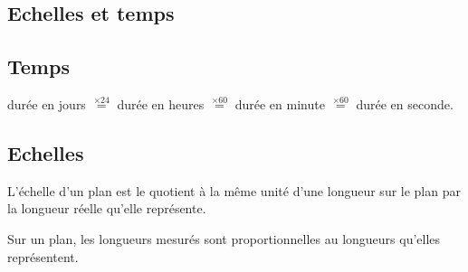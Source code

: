 \documentclass[paper=a4, fontsize=9pt]{scrartcl} %
\begin{document}
\begin{multicols}{2}

  \section{Echelles et temps}

  \subsection{Temps}

  durée en jours $\stackrel{\times 24}{=}$ durée en heures $\stackrel{\times 60}{=}$ durée en minute $\stackrel{\times 60}{=}$ durée en seconde.
  \subsection{Echelles}

  \begin{Definition}
    L'échelle d'un plan est le quotient à la même unité d'une longueur sur le plan par la longueur réelle qu'elle représente.
  \end{Definition}

  \begin{Proposition}
    Sur un plan, les longueurs mesurés sont proportionnelles au longueurs qu'elles représentent.
  \end{Proposition}

\end{multicols}
\end{document}
